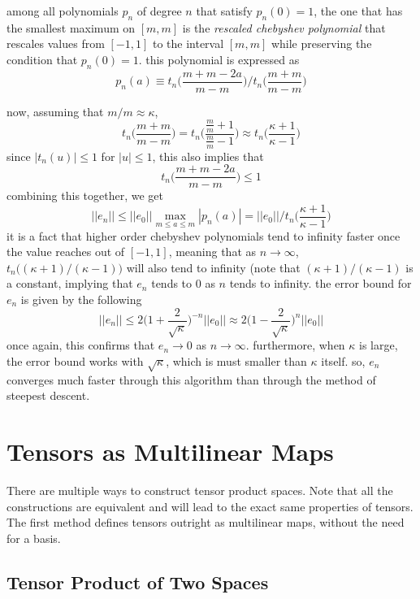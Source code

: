 \documentclass{article}
\begin{document}
    \begin{proposition}
    among all polynomials $p_n$ of degree $n$ that satisfy $p_n (0) = 1$, the one that has the smallest maximum on $[m, m]$ is the \textit{rescaled chebyshev polynomial} that rescales values from $[-1, 1]$ to the interval $[m, m]$ while preserving the condition that $p_n (0) = 1$. this polynomial is expressed as
    \[p_n (a) \equiv t_n \bigg( \frac{m+m-2a}{m-m} \bigg) \bigg/ t_n \bigg(\frac{m+m}{m-m} \bigg)\]
    \end{proposition} 
    now, assuming that $m/m \approx \kappa$, 
    \[t_n \bigg( \frac{m+m}{m-m} \bigg) = t_n \bigg(\frac{\frac{m}{m} + 1}{\frac{m}{m}-1} \bigg) \approx t_n \bigg(\frac{\kappa + 1}{\kappa - 1} \bigg)\]
    since $|t_n (u)| \leq 1$ for $|u| \leq 1$, this also implies that
    \[t_n \bigg( \frac{m + m - 2a}{m-m} \bigg) \leq 1\]
    combining this together, we get
    \[||e_n|| \leq ||e_0|| \max_{m \leq a \leq m} |p_n (a)| = ||e_0|| \bigg/ t_n \bigg( \frac{\kappa+1}{\kappa-1} \bigg)\]
    it is a fact that higher order chebyshev polynomials tend to infinity faster once the value reaches out of $[-1, 1]$, meaning that as $n \rightarrow \infty$, $t_n\big( (\kappa+1)/(\kappa-1)\big)$ will also tend to infinity (note that $(\kappa+1)/(\kappa-1)$ is a constant, implying that $e_n$ tends to $0$ as $n$ tends to infinity. the error bound for $e_n$ is given by the following 
    \[||e_n|| \leq 2 \bigg( 1 + \frac{2}{\sqrt{\kappa}} \bigg)^{-n} ||e_0|| \approx 2 \bigg( 1 - \frac{2}{\sqrt{\kappa}} \bigg)^{n} ||e_0||\]
    once again, this confirms that $e_n \rightarrow 0$ as $n \rightarrow \infty$. furthermore, when $\kappa$ is large, the error bound works with $\sqrt{\kappa}$, which is must smaller than $\kappa$ itself. so, $e_n$ converges much faster through this algorithm than through the method of steepest descent. 

\section{Tensors as Multilinear Maps}

  There are multiple ways to construct tensor product spaces. Note that all the constructions are equivalent and will lead to the exact same properties of tensors. The first method defines tensors outright as multilinear maps, without the need for a basis. 

  \subsection{Tensor Product of Two Spaces}
\end{document}
